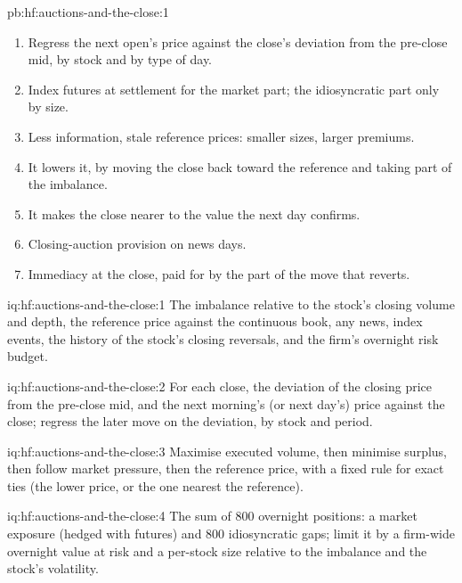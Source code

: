 \begin{solution}{pb:hf:auctions-and-the-close:1}
\begin{enumerate}
\item Regress the next open's price against the close's deviation from the pre-close mid, by stock and by type of day.
\item Index futures at settlement for the market part; the idiosyncratic part only by size.
\item Less information, stale reference prices: smaller sizes, larger premiums.
\item It lowers it, by moving the close back toward the reference and taking part of the imbalance.
\item It makes the close nearer to the value the next day confirms.
\item Closing-auction provision on news days.
\item Immediacy at the close, paid for by the part of the move that reverts.
\end{enumerate}
\end{solution}

\begin{solution}{iq:hf:auctions-and-the-close:1}
The imbalance relative to the stock's closing volume and depth, the reference price against the continuous book, any news, index events, the
history of the stock's closing reversals, and the firm's overnight risk budget.
\end{solution}

\begin{solution}{iq:hf:auctions-and-the-close:2}
For each close, the deviation of the closing price from the pre-close mid, and the next morning's (or next day's) price against the close; regress
the later move on the deviation, by stock and period.
\end{solution}

\begin{solution}{iq:hf:auctions-and-the-close:3}
Maximise executed volume, then minimise surplus, then follow market pressure, then the reference price, with a fixed rule for exact ties (the
lower price, or the one nearest the reference).
\end{solution}

\begin{solution}{iq:hf:auctions-and-the-close:4}
The sum of 800 overnight positions: a market exposure (hedged with futures) and 800 idiosyncratic gaps; limit it by a firm-wide overnight value at
risk and a per-stock size relative to the imbalance and the stock's volatility.
\end{solution}


